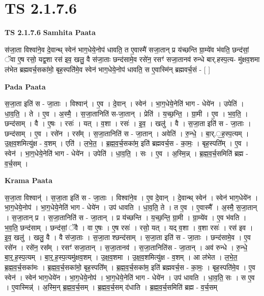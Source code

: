 \documentclass[17pt]{extarticle}
\begin{document}
\section*{ TS 2.1.7.6 }

\textbf{TS 2.1.7.6 } \newline
\textbf{Samhita Paata} \newline

स॑जा॒ता विश्वा॑ने॒व दे॒वान्थ् स्वेन॑ भाग॒धेये॒नोप॑ धावति॒ त ए॒वास्मै॑ सजा॒तान् प्र य॑च्छन्ति ग्रा॒म्ये॑व भ॑वति॒ छन्द॑सां॒ ॅवा ए॒ष रसो॒ यद्व॒शा रस॑ इव॒ खलु॒ वै स॑जा॒ताः छन्द॑सामे॒व रसे॑न॒ रसꣳ॑ सजा॒तानव॑ रुन्धे बार्.हस्प॒त्य- मु॑क्षव॒शमा ल॑भेत ब्रह्मवर्च॒सका॑मो॒ बृह॒स्पति॑मे॒व स्वेन॑ भाग॒धेये॒नोप॑ धावति॒ स ए॒वास्मि॑न् ब्रह्मवर्च॒सं - [  ] \newline

\textbf{Pada Paata} \newline

स॒जा॒ता इति॑ स - जा॒ताः । विश्वान्॑ । ए॒व । दे॒वान् । स्वेन॑ । भा॒ग॒धेये॒नेति॑ भाग - धेये॑न । उपेति॑ । धा॒व॒ति॒ । ते । ए॒व । अ॒स्मै॒ । स॒जा॒तानिति॑ स-जा॒तान् । प्रेति॑ । य॒च्छ॒न्ति॒ । ग्रा॒मी । ए॒व । भ॒व॒ति॒ । छन्द॑साम् । वै । ए॒षः । रसः॑ । यत् । व॒शा । रसः॑ । इ॒व॒ । खलु॑ । वै । स॒जा॒ता इति॑ स - जा॒ताः । छन्द॑साम् । ए॒व । रसे॑न । रस᳚म् । स॒जा॒तानिति॑ स - जा॒तान् । अवेति॑ । रु॒न्धे॒ । बा॒र्.॒ह॒स्प॒त्यम् । उ॒क्ष॒व॒शमित्यु॑क्ष - व॒शम् । एति॑ । ल॒भे॒त॒ । ब्र॒ह्म॒व॒र्च॒सका॑म॒ इति॑ ब्रह्मवर्च॒स - का॒मः॒ । बृह॒स्पति᳚म् । ए॒व । स्वेन॑ । भा॒ग॒धेये॒नेति॑ भाग - धेये॑न । उपेति॑ । धा॒व॒ति॒ । सः । ए॒व । अ॒स्मि॒न्न् । ब्र॒ह्म॒व॒र्च॒समिति॑ ब्रह्म - व॒र्च॒सम् ।  \newline


\textbf{Krama Paata} \newline

स॒जा॒ता विश्वान्॑ । स॒जा॒ता इति॑ स - जा॒ताः । विश्वा॑ने॒व । ए॒व दे॒वान् । दे॒वान्थ् स्वेन॑ । स्वेन॑ भाग॒धेये॑न । भा॒ग॒धेये॒नोप॑ । भा॒ग॒धेये॒नेति॑ भाग - धेये॑न । उप॑ धावति । धा॒व॒ति॒ ते । त ए॒व । ए॒वास्मै᳚ । अ॒स्मै॒ स॒जा॒तान् । स॒जा॒तान् प्र । स॒जा॒तानिति॑ स - जा॒तान् । प्र य॑च्छन्ति । य॒च्छ॒न्ति॒ ग्रा॒मी । ग्रा॒म्ये॑व । ए॒व भ॑वति । भ॒व॒ति॒ छन्द॑साम् । छन्द॑सां॒ ॅवै । वा ए॒षः । ए॒ष रसः॑ । रसो॒ यत् । यद् व॒शा । व॒शा रसः॑ । रस॑ इव । इ॒व॒ खलु॑ । खलु॒ वै । वै स॑जा॒ताः । स॒जा॒ता श्छन्द॑साम् । स॒जा॒ता इति॑ स - जा॒ताः । छन्द॑सामे॒व । ए॒व रसे॑न । रसे॑न॒ रस᳚म् । रसꣳ॑ सजा॒तान् । स॒जा॒तानव॑ । स॒जा॒तानिति॑स - जा॒तान् । अव॑ रुन्धे । रु॒न्धे॒ बा॒र्॒.ह॒स्प॒त्यम् । बा॒र्॒.ह॒स्प॒त्यमु॑क्षव॒शम् । उ॒क्ष॒व॒शमा । उ॒क्ष॒व॒शमित्यु॑क्ष - व॒शम् । आ ल॑भेत । ल॒भे॒त॒ ब्र॒ह्म॒व॒र्च॒सका॑मः । ब्र॒ह्म॒व॒र्च॒सका॑मो॒ बृह॒स्पति᳚म् । ब्र॒ह्म॒व॒र्च॒सका॑म॒ इति॑ ब्रह्मवर्च॒स - का॒मः॒ । बृह॒स्पति॑मे॒व । ए॒व स्वेन॑ । स्वेन॑ भाग॒धेये॑न । भा॒ग॒धेये॒नोप॑ । भा॒ग॒धेये॒नेति॑ भाग - धेये॑न । उप॑ धावति । धा॒व॒ति॒ सः । स ए॒व । ए॒वास्मिन्न्॑ । अ॒स्मि॒न् ब्र॒ह्म॒व॒र्च॒सम् । ब्र॒ह्म॒व॒र्च॒सम् द॑धाति । ब्र॒ह्म॒व॒र्च॒समिति॑ ब्रह्म - व॒र्च॒सम् \newline
\end{document}
